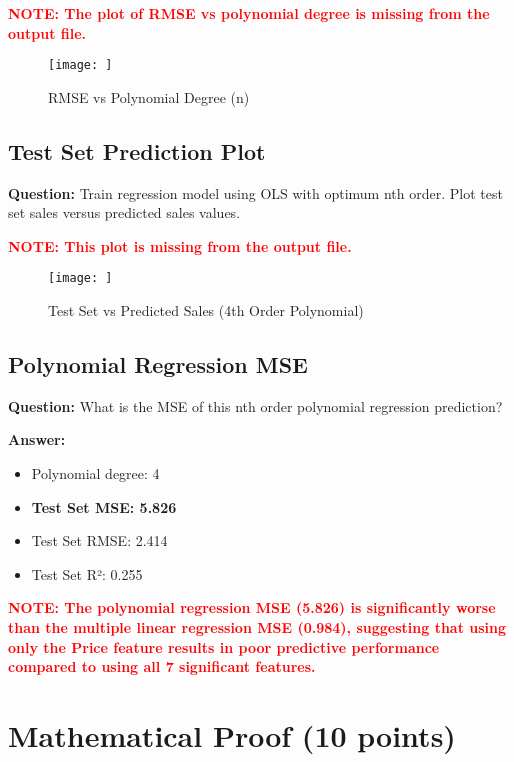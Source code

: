 \documentclass[11pt]{article}
\begin{document}
\textcolor{red}{\textbf{NOTE: The plot of RMSE vs polynomial degree is missing from the output file.}}

\begin{figure}[H]
    \centering
    \texttt{[image: ]}
    \caption{RMSE vs Polynomial Degree (n)}
    \label{fig:poly_rmse}
\end{figure}

\subsection{Test Set Prediction Plot}

\textbf{Question:} Train regression model using OLS with optimum nth order. Plot test set sales versus predicted sales values.

\textcolor{red}{\textbf{NOTE: This plot is missing from the output file.}}

\begin{figure}[H]
    \centering
    \texttt{[image: ]}
    \caption{Test Set vs Predicted Sales (4th Order Polynomial)}
    \label{fig:poly_prediction}
\end{figure}

\subsection{Polynomial Regression MSE}

\textbf{Question:} What is the MSE of this nth order polynomial regression prediction?

\textbf{Answer:}
\begin{itemize}
    \item Polynomial degree: 4
    \item \textbf{Test Set MSE: 5.826}
    \item Test Set RMSE: 2.414
    \item Test Set R²: 0.255
\end{itemize}

\textcolor{red}{\textbf{NOTE: The polynomial regression MSE (5.826) is significantly worse than the multiple linear regression MSE (0.984), suggesting that using only the Price feature results in poor predictive performance compared to using all 7 significant features.}}

\section{Mathematical Proof (10 points)}
\end{document}

